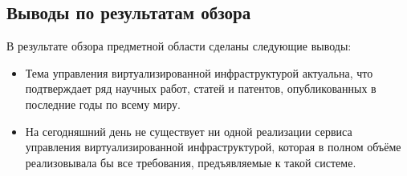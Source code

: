 \subsection{Выводы по результатам обзора}
В результате обзора предметной области сделаны следующие выводы:
\begin{itemize}
    \item Тема управления виртуализированной инфраструктурой актуальна, что подтверждает ряд научных работ, статей и патентов, опубликованных в последние годы по всему миру.
    \item На сегодняшний день не существует ни одной реализации сервиса управления виртуализированной инфраструктурой, которая в полном объёме реализовывала бы все требования, предъявляемые к такой системе.
\end{itemize}